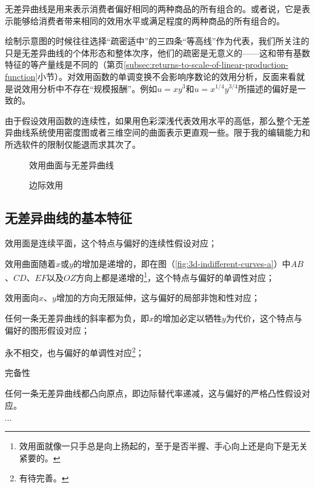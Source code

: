 \begin{Definition}[无差异曲线]
无差异曲线是用来表示消费者偏好相同的两种商品的所有组合的。或者说，它是表示能够给消费者带来相同的效用水平或满足程度的两种商品的所有组合的。\cite{courant2001chs}
\end{Definition}

绘制示意图的时候往往选择“疏密适中”的三四条“等高线”作为代表，我们所关注的只是无差异曲线的个体形态和整体次序，他们的疏密是无意义的——这和带有基数特征的等产量线是不同的（第\pageref{subsec:returns-to-scale-of-linear-production-function}页\ref{subsec:returns-to-scale-of-linear-production-function}小节）。对效用函数的单调变换不会影响序数论的效用分析，反面来看就是说效用分析中不存在“规模报酬”。例如$u=x y^3$和$u=x^{1/4} y^{3/4}$所描述的偏好是一致的。


由于假设效用函数的连续性，如果用色彩深浅代表效用水平的高低，那么整个无差异曲线系统使用密度图或者三维空间的曲面表示更直观一些。限于我的编辑能力和所选软件的限制仅能退而求其次了。

\begin{figure}[!h]
\begin{shaded*}
\begin{minipage}[t]{0.5\linewidth} 
\centering 

\caption{效用曲面与无差异曲线}
\label{fig:3d-indifferent-curves-a}
\end{minipage}%
\begin{minipage}[t]{0.5\linewidth} 
\centering

\caption{边际效用}
\label{fig:3d-indifferent-curves-b}%
\end{minipage} 
\end{shaded*}
\end{figure}

\subsection*{无差异曲线的基本特征}
\begin{compactitem}
\item 效用面是连续平面，这个特点与偏好的连续性假设对应；
\item 效用曲面随着$x$或$y$的增加是递增的，即在图（\ref{fig:3d-indifferent-curves-a}）中$AB$、$CD$、$EF$以及$OZ$方向上都是递增的\footnote{%
		效用面就像一只手总是向上扬起的，至于是否半握、手心向上还是向下是无关紧要的。}，这个特点与偏好的单调性对应；
\item 效用面向$x$、$y$增加的方向无限延伸，这与偏好的局部非饱和性对应；
\item 任何一条无差异曲线的斜率都为负，即$x$的增加必定以牺牲$y$为代价，这个特点与偏好的图形假设对应；
\item 永不相交，也与偏好的单调性对应\footnote{%
		有待完善。}；
\item 完备性
\item 任何一条无差异曲线都凸向原点，即边际替代率递减，这与偏好的严格凸性假设对应。
\item $\cdots$
\end{compactitem}

